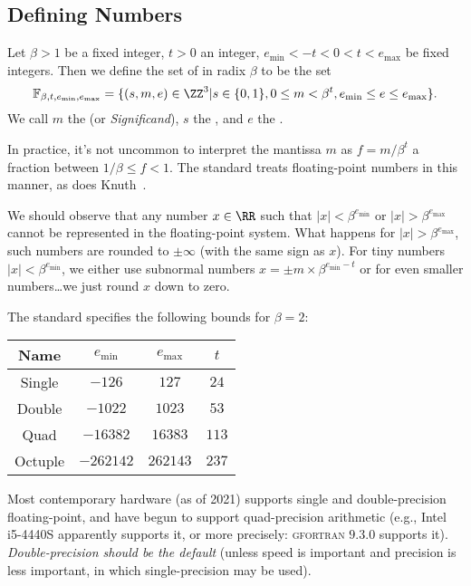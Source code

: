 \subsection{Defining Numbers}
\begin{defn}
  Let $\beta>1$ be a fixed integer, $t>0$ an integer,
  $e_{\text{min}}<-t<0<t<e_{\text{max}}$ be
  fixed integers. Then we define the set of 
  in radix $\beta$ to be the set
  \begin{equation}
    \mathbb{F}_{\beta,t,e_{\text{min}},e_{\text{max}}} = \{(s,m,e)\in\ZZ^{3}|
    s\in\{0,1\}, 0\leq m<\beta^{t}, e_{\text{min}}\leq e\leq e_{\text{max}}\}.
  \end{equation}
  We call $m$ the  (or \emph{Significand}), $s$ the
  , and $e$ the .
\end{defn}
\begin{danger}
  In practice, it's not uncommon to interpret the mantissa $m$ as
  $f=m/\beta^{t}$ a fraction between $1/\beta\leq f<1$. The 
  standard treats floating-point numbers in this manner, as does
  Knuth~\cite{taocp2}.
\end{danger}
\begin{ddanger}
  We should observe that any number $x\in\RR$ such that $|x|<\beta^{e_{\text{min}}}$
  or $|x|>\beta^{e_{\text{max}}}$ cannot be represented in
  the floating-point system. What happens for
  $|x|>\beta^{e_{\text{max}}}$, such numbers are rounded to $\pm\infty$
  (with the same sign as $x$). For tiny numbers $|x|<\beta^{e_{\text{min}}}$,
  we either use subnormal numbers $x=\pm m\times\beta^{e_{\text{min}}-t}$
  or for even smaller numbers\dots we just round $x$ down to zero.
\end{ddanger}
\begin{rmk}
  The  standard specifies the following bounds for $\beta=2$:
  \begin{center}
    \begin{tabular}{|c|c|c|c|}
      Name   & $e_{\text{min}}$ & $e_{\text{max}}$ & $t$ \\\hline
      Single & $-126$         & $127$          & $24$\\
      Double & $-1022$        & $1023$         & $53$\\
      Quad   & $-16382$       & $16383$        & $113$\\
      Octuple & $-262142$     & $262143$       & $237$
    \end{tabular}
  \end{center}
  Most contemporary hardware (as of 2021) supports single and
  double-precision floating-point, and have begun to support
  quad-precision arithmetic (e.g., Intel i5-4440S apparently supports
  it, or more precisely: \textsc{gfortran} $9.3.0$ supports
  it). \emph{Double-precision should be the default} (unless speed is important
  and precision is less important, in which single-precision may be used).
\end{rmk}
